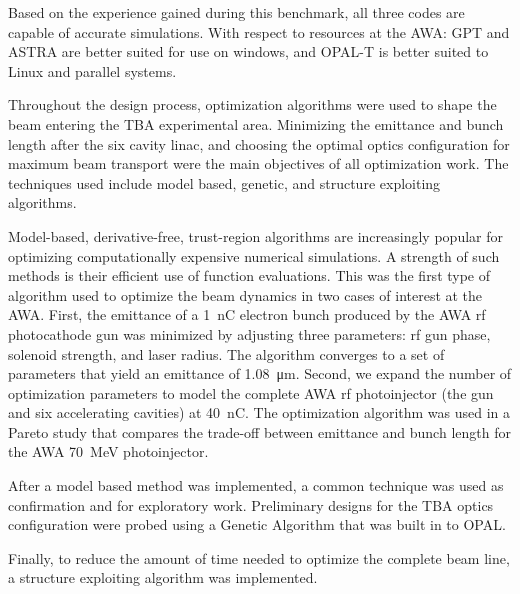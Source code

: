 Based on the experience gained during this benchmark, 
all  three  codes  are  capable  of  accurate  simulations.  With  
respect  to  resources  at  the  AWA:  GPT  and  ASTRA  are  
better  suited  for  use  on  windows,  and  OPAL-T  is  better  
suited to Linux and parallel systems.

 \label{sec:opt}
Throughout the design process, optimization algorithms 
were used to shape the beam entering the TBA experimental area.
Minimizing the emittance and bunch length after the six cavity linac,
and choosing the optimal optics configuration for maximum beam transport 
were the main objectives of all optimization work.
The techniques used include model based, genetic,
and structure exploiting algorithms. 
 
Model-based, derivative-free, trust-region algorithms 
are increasingly popular for optimizing computationally 
expensive numerical simulations. A strength of such
methods is their efficient use of function evaluations. 
This was the first type of algorithm used to optimize 
the beam dynamics in two cases of interest at the AWA. 
First, the emittance of a \SI{1}{nC} electron 
bunch produced by the AWA rf photocathode gun 
was minimized by adjusting three parameters: rf gun phase, 
solenoid strength, and laser radius. The algorithm 
converges to a set of parameters that yield an
emittance of \SI{1.08}{\um}. Second, we expand 
the number of optimization parameters to model the complete AWA rf 
photoinjector (the gun and six accelerating cavities) at \SI{40}{nC}. 
The optimization algorithm was used in a Pareto study that compares the 
trade-off between emittance and bunch 
length for the AWA \SI{70}{MeV} photoinjector. 

After a model based method was implemented, a common technique was 
used as confirmation and for exploratory work. Preliminary designs 
for the TBA optics configuration were probed using a Genetic Algorithm
that was built in to OPAL.  

Finally, to reduce the amount of time needed to optimize the complete beam line, 
a structure exploiting algorithm was implemented. 


